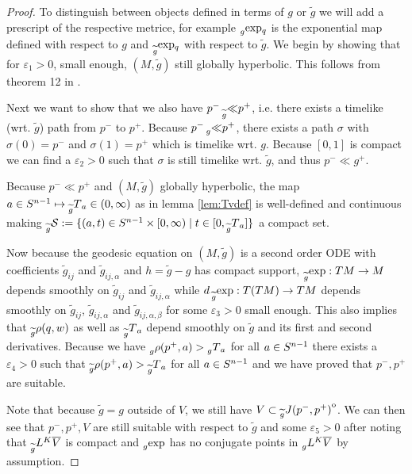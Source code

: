 \begin{proof}
    To distinguish between objects defined in terms of $g$ or $\widetilde{g}$ we will add a prescript of the respective metrice, for example $\prescript{}{g}{\exp}_q$ is the exponential map defined with respect to $g$ and $\prescript{}{\widetilde{g}}{\exp}_q$ with respect to $\widetilde{g}$. We begin by showing that for $\varepsilon_1>0$, small enough, $(M,\widetilde{g})$ still globally hyperbolic. This follows from theorem 12 in \cite{gerochdomain}.
    
    Next we want to show that we also have $p^- \prescript{}{\widetilde{g}}{\ll} p^+$, i.e. there exists a timelike (wrt. $\widetilde{g}$) path from 
    $p^-$ to $p^+$. Because $p^- \prescript{}{g}{\ll} p^+$, there exists a path $\sigma$ with $\sigma(0)=p^-$ and $\sigma(1)=p^+$ which is timelike wrt. $g$. Because $[0,1]$ is compact we can find a $\varepsilon_2>0$ such that $\sigma$ is still timelike wrt. $\widetilde{g}$, and thus $p^-\ll g^+$.

    Because $p^-\ll p^+$ and $(M,\widetilde{g})$ globally hyperbolic, the map $a\in {S^{n-1}} \mapsto \prescript{}{\widetilde{g}}{T}_a\in (0,\infty)$ as in lemma \ref{lem:Tvdef} is well-defined and continuous making $\prescript{}{\widetilde{g}}{{\mathcal{S}}} := \{(a,t)\in {S^{n-1}}\times [0,\infty) \mid t\in [0,\prescript{}{\widetilde{g}}{T}_a]\}$ a compact set. 

    Now because the geodesic equation on $(M,\widetilde{g})$ is a second order ODE with coefficients $\widetilde{g}_{ij}$ and $\widetilde{g}_{ij,\alpha}$ and $h=\widetilde{g}-g$ has compact support, $\prescript{}{\widetilde{g}}{\exp}:TM\to M$ depends smoothly on $\widetilde{g}_{ij}$ and $\widetilde{g}_{ij,\alpha}$ while $d\prescript{}{\widetilde{g}}{\exp}:T(TM)\to TM$ depends smoothly on $\widetilde{g}_{ij}$, $\widetilde{g}_{ij,\alpha}$ and $\widetilde{g}_{ij,\alpha,\beta}$ for some $\varepsilon_3>0$ small enough. This also implies that $\prescript{}{\widetilde{g}}{\rho(q,w)}$ as well as $\prescript{}{\widetilde{g}}{T}_a$ depend smoothly on $\widetilde{g}$ and its first and second derivatives. Because we have $\prescript{}{g}{\rho(p^+,a)}>\prescript{}{g}{T}_a$ for all $a\in {S^{n-1}}$ there exists a $\varepsilon_4>0$ such that $\prescript{}{\widetilde{g}}{\rho(p^+,a)}>\prescript{}{\widetilde{g}}{T}_a$ for all $a\in {S^{n-1}}$ and we have proved that $p^-,p^+$ are suitable.

    Note that because $\widetilde{g}=g$ outside of $V$, we still have $V\subset {\kern0pt\prescript{}{\widetilde{g}}{J(p^-,p^+)}}^{\mathrm{o}}$. We can then see that $p^-,p^+,V$ are still suitable with respect to $\widetilde{g}$ and some $\varepsilon_5>0$ after noting that $\prescript{}{\widetilde{g}}{L}^K{\overline{V}}$ is compact and $\prescript{}{g}{\exp}$ has no conjugate points in $\prescript{}{g}{L}^K{\overline{V}}$ by assumption.
\end{proof}

